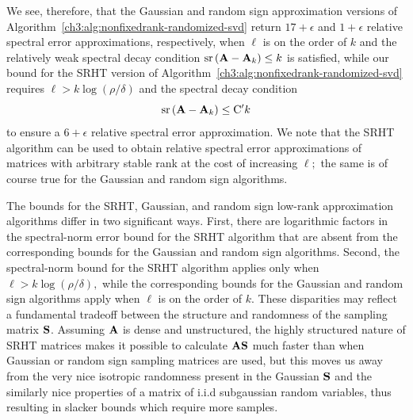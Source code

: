 We see, therefore, that the Gaussian and random sign approximation versions
of Algorithm~\ref{ch3:alg:nonfixedrank-randomized-svd} return $17+\epsilon$ 
and $1+\epsilon$ relative spectral error approximations, respectively, when 
$\ell$ is on the order of $k$ and the relatively weak spectral decay condition 
$\operatorname{sr}\left(\mathbf{A} - \mathbf{A}_k\right) \leq k$ is satisfied, while our bound for the 
SRHT version of Algorithm~\ref{ch3:alg:nonfixedrank-randomized-svd} requires
$\ell > k \log (\rho/\delta)$ and the spectral decay condition
$$\operatorname{sr}\left(\mathbf{A} - \mathbf{A}_k\right) \leq \mathrm{C}^\prime k$$
to ensure a $6 + \epsilon$ relative spectral error approximation. We note that 
the SRHT algorithm can be used to obtain relative spectral error approximations
of matrices with arbitrary stable rank at the cost of increasing $\ell;$ 
the same is of course true for the Gaussian and random sign algorithms.

The bounds for the SRHT, Gaussian, and random sign low-rank approximation algorithms differ in two
significant ways. First, there are logarithmic factors in the spectral-norm error bound 
for the SRHT algorithm that are absent from the corresponding bounds for the
Gaussian and random sign algorithms. Second, the spectral-norm bound for the 
SRHT algorithm applies only when $\ell > k \log(\rho/\delta),$
while the corresponding bounds for the Gaussian and random sign algorithms
apply when $\ell$ is on the order of $k.$ These disparities may reflect a fundamental tradeoff 
between the structure and randomness of the sampling matrix $\mathbf{S}$. Assuming $\mathbf{A}$ is
dense and unstructured, the highly structured nature 
of SRHT matrices makes it possible to calculate $\mathbf{A}\mathbf{S}$ much faster than when 
Gaussian or random sign sampling matrices are used, but this moves us away from the very nice isotropic 
randomness present in the Gaussian $\mathbf{S}$ and the similarly nice 
properties of a matrix of i.i.d subgaussian random variables, thus resulting 
in slacker bounds which require more samples.


